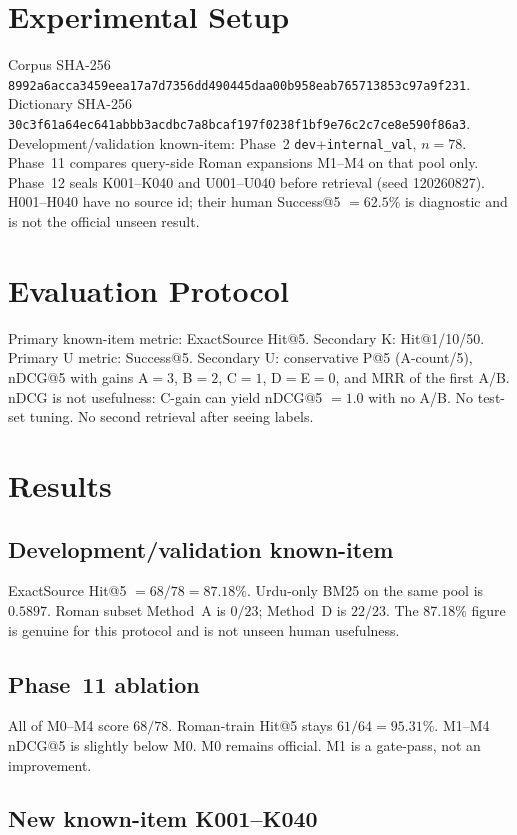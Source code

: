 \documentclass[conference]{IEEEtran}
\begin{document}
\section{Experimental Setup}

Corpus SHA-256 \texttt{8992a6acca3459eea17a7d7356dd490445daa00b958eab765713853c97a9f231}. Dictionary SHA-256 \texttt{30c3f61a64ec641abbb3acdbc7a8bcaf197f0238f1bf9e76c2c7ce8e590f86a3}. Development/validation known-item: Phase~2 \texttt{dev}+\texttt{internal\_val}, $n=78$. Phase~11 compares query-side Roman expansions M1--M4 on that pool only. Phase~12 seals K001--K040 and U001--U040 before retrieval (seed 120260827). H001--H040 have no source id; their human Success@5 $=62.5\%$ is diagnostic and is not the official unseen result.

\section{Evaluation Protocol}

Primary known-item metric: ExactSource Hit@5. Secondary K: Hit@1/10/50. Primary U metric: Success@5. Secondary U: conservative P@5 (A-count/5), nDCG@5 with gains A$=3$, B$=2$, C$=1$, D$=$E$=0$, and MRR of the first A/B. nDCG is not usefulness: C-gain can yield nDCG@5 $=1.0$ with no A/B. No test-set tuning. No second retrieval after seeing labels.

\section{Results}

\subsection{Development/validation known-item}

ExactSource Hit@5 $=68/78=87.18\%$. Urdu-only BM25 on the same pool is $0.5897$. Roman subset Method~A is $0/23$; Method~D is $22/23$. The 87.18\% figure is genuine for this protocol and is not unseen human usefulness.

\subsection{Phase~11 ablation}

All of M0--M4 score $68/78$. Roman-train Hit@5 stays $61/64=95.31\%$. M1--M4 nDCG@5 is slightly below M0. M0 remains official. M1 is a gate-pass, not an improvement.

\subsection{New known-item K001--K040}
\end{document}
